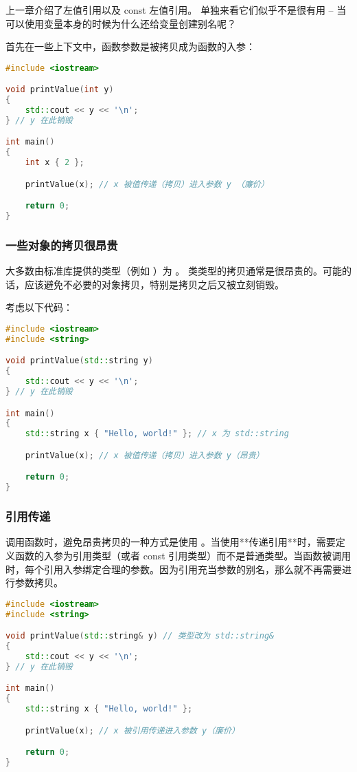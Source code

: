 \documentclass[../../LearnCpp.tex]{subfiles}
\begin{document}

上一章介绍了左值引用以及 const 左值引用。
单独来看它们似乎不是很有用 -- 当可以使用变量本身的时候为什么还给变量创建别名呢？

首先在一些上下文中，函数参数是被拷贝成为函数的入参：

\begin{lstlisting}[language=C++]
#include <iostream>

void printValue(int y)
{
    std::cout << y << '\n';
} // y 在此销毁

int main()
{
    int x { 2 };

    printValue(x); // x 被值传递（拷贝）进入参数 y （廉价）

    return 0;
}
\end{lstlisting}

\subsubsection*{一些对象的拷贝很昂贵}

大多数由标准库提供的类型（例如 ）为 。
类类型的拷贝通常是很昂贵的。可能的话，应该避免不必要的对象拷贝，特别是拷贝之后又被立刻销毁。

考虑以下代码：

\begin{lstlisting}[language=C++]
#include <iostream>
#include <string>

void printValue(std::string y)
{
    std::cout << y << '\n';
} // y 在此销毁

int main()
{
    std::string x { "Hello, world!" }; // x 为 std::string

    printValue(x); // x 被值传递（拷贝）进入参数 y（昂贵）

    return 0;
}
\end{lstlisting}

\subsubsection*{引用传递}

调用函数时，避免昂贵拷贝的一种方式是使用 。当使用**传递引用**时，需要定义函数的入参为引用类型（或者 const 引用类型）而不是普通类型。当函数被调用时，每个引用入参绑定合理的参数。因为引用充当参数的别名，那么就不再需要进行参数拷贝。

\begin{lstlisting}[language=C++]
#include <iostream>
#include <string>

void printValue(std::string& y) // 类型改为 std::string&
{
    std::cout << y << '\n';
} // y 在此销毁

int main()
{
    std::string x { "Hello, world!" };

    printValue(x); // x 被引用传递进入参数 y（廉价）

    return 0;
}
\end{lstlisting}
\end{document}
